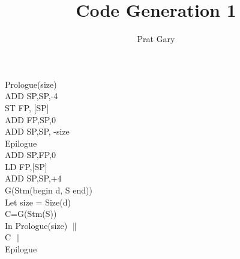 \documentclass[10pt,a4paper]{article}
\author{Prat Gary}
\title{Code Generation 1}
\begin{document}
\maketitle
Prologue(size)\\
ADD SP,SP,-4\\
ST FP, [SP]\\
ADD FP,SP,0\\
ADD SP,SP, -size\\

Epilogue\\
ADD SP,FP,0\\
LD FP,[SP]\\
ADD SP,SP,+4\\

G(Stm(begin d, S end))\\
Let size = Size(d)\\
C=G(Stm(S))\\
In Prologue(size) $\|$\\ C $\|$\\ Epilogue
\end{document}
